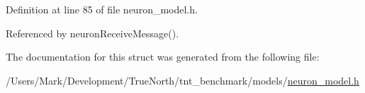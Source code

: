 Definition at line 85 of file neuron\+\_\+model.\+h.



Referenced by neuron\+Receive\+Message().



The documentation for this struct was generated from the following file\+:\begin{DoxyCompactItemize}
\item 
/\+Users/\+Mark/\+Development/\+True\+North/tnt\+\_\+benchmark/models/\hyperlink{neuron__model_8h}{neuron\+\_\+model.\+h}\end{DoxyCompactItemize}
